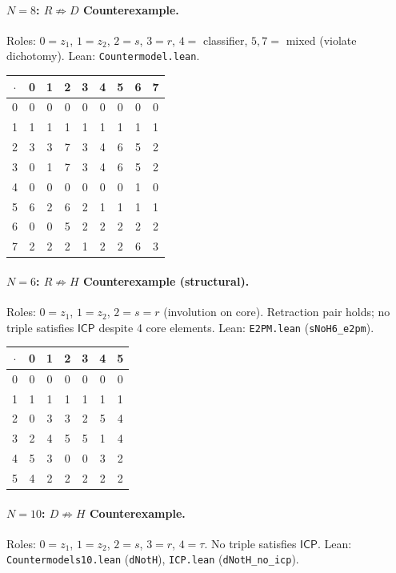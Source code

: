 \documentclass[sigconf,screen,review,anonymous]{acmart}
\newcommand{\dotop}{\cdot}
\newcommand{\ICP}{\textsf{ICP}}
\theoremstyle{remark}
\begin{document}
\paragraph{$N\!=\!8$: $R \not\Rightarrow D$ Counterexample.}
Roles: $0 = z_1$, $1 = z_2$, $2 = s$, $3 = r$, $4 =$ classifier, $5, 7 =$ mixed (violate dichotomy). \quad Lean: \texttt{Countermodel.lean}.

\medskip
{\small
\begin{tabular}{c|cccccccc}
$\dotop$ & 0 & 1 & 2 & 3 & 4 & 5 & 6 & 7 \\\hline
0 & 0 & 0 & 0 & 0 & 0 & 0 & 0 & 0 \\
1 & 1 & 1 & 1 & 1 & 1 & 1 & 1 & 1 \\
2 & 3 & 3 & 7 & 3 & 4 & 6 & 5 & 2 \\
3 & 0 & 1 & 7 & 3 & 4 & 6 & 5 & 2 \\
4 & 0 & 0 & 0 & 0 & 0 & 0 & 1 & 0 \\
5 & 6 & 2 & 6 & 2 & 1 & 1 & 1 & 1 \\
6 & 0 & 0 & 5 & 2 & 2 & 2 & 2 & 2 \\
7 & 2 & 2 & 2 & 1 & 2 & 2 & 6 & 3 \\
\end{tabular}}

\paragraph{$N\!=\!6$: $R \not\Rightarrow H$ Counterexample (structural).}
Roles: $0 = z_1$, $1 = z_2$, $2 = s = r$ (involution on core). Retraction pair holds; no triple satisfies $\ICP$ despite 4 core elements. \quad Lean: \texttt{E2PM.lean} (\texttt{sNoH6\_e2pm}).

\medskip
{\small
\begin{tabular}{c|cccccc}
$\dotop$ & 0 & 1 & 2 & 3 & 4 & 5 \\\hline
0 & 0 & 0 & 0 & 0 & 0 & 0 \\
1 & 1 & 1 & 1 & 1 & 1 & 1 \\
2 & 0 & 3 & 3 & 2 & 5 & 4 \\
3 & 2 & 4 & 5 & 5 & 1 & 4 \\
4 & 5 & 3 & 0 & 0 & 3 & 2 \\
5 & 4 & 2 & 2 & 2 & 2 & 2 \\
\end{tabular}}

\paragraph{$N\!=\!10$: $D \not\Rightarrow H$ Counterexample.}
Roles: $0 = z_1$, $1 = z_2$, $2 = s$, $3 = r$, $4 = \tau$. No triple satisfies $\ICP$. \quad Lean: \texttt{Countermodels10.lean} (\texttt{dNotH}), \texttt{ICP.lean} (\texttt{dNotH\_no\_icp}).
\end{document}
